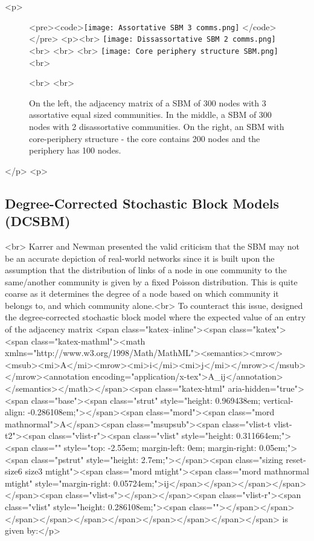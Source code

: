 <p>\begin{figure}[h]%
<pre><code>\texttt{[image: Assortative SBM 3 comms.png]}
\label{3assortative}
</code></pre>
<p>\hfill<br>
\texttt{[image: Dissassortative SBM 2 comms.png]}<br>
\label{2dissassortative}<br>
\hfill<br>
\texttt{[image: Core periphery structure SBM.png]}<br>
\caption{On the left, the adjacency matrix of a SBM of 300 nodes with 3 assortative equal sized communities. In the middle, a SBM of 300 nodes with 2 disassortative communities. On the right, an SBM with core-periphery structure - the core contains 200 nodes and the periphery has 100 nodes. }<br>
\label{coreperiphery}<br>
\end{figure}</p>
<p>\subsection{Degree-Corrected Stochastic Block Models (DCSBM)}<br>
Karrer and Newman  \cite{karrer_newman_2011} presented the valid criticism that the SBM may not  be an accurate depiction of real-world networks since it is built upon the assumption that the distribution of links of a node in one community to the same/another community is given by a fixed Poisson distribution. This is quite coarse as it determines the degree of a node based on which community it belongs to, and which community alone.<br>
To counteract this issue, \cite{karrer_newman_2011} designed the degree-corrected stochastic block model where the expected value of an entry of the adjacency matrix <span class="katex--inline"><span class="katex"><span class="katex-mathml"><math xmlns="http://www.w3.org/1998/Math/MathML"><semantics><mrow><msub><mi>A</mi><mrow><mi>i</mi><mi>j</mi></mrow></msub></mrow><annotation encoding="application/x-tex">A_{ij}</annotation></semantics></math></span><span class="katex-html" aria-hidden="true"><span class="base"><span class="strut" style="height: 0.969438em; vertical-align: -0.286108em;"></span><span class="mord"><span class="mord mathnormal">A</span><span class="msupsub"><span class="vlist-t vlist-t2"><span class="vlist-r"><span class="vlist" style="height: 0.311664em;"><span class="" style="top: -2.55em; margin-left: 0em; margin-right: 0.05em;"><span class="pstrut" style="height: 2.7em;"></span><span class="sizing reset-size6 size3 mtight"><span class="mord mtight"><span class="mord mathnormal mtight" style="margin-right: 0.05724em;">ij</span></span></span></span></span><span class="vlist-s">​</span></span><span class="vlist-r"><span class="vlist" style="height: 0.286108em;"><span class=""></span></span></span></span></span></span></span></span></span></span> is given by:</p>
